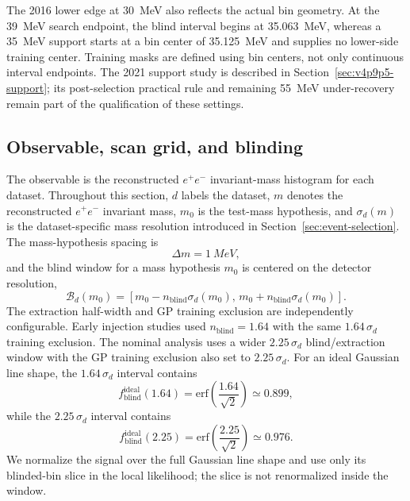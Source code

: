 The 2016 lower edge at 30~MeV also reflects the actual bin geometry. At the
39~MeV search endpoint, the blind interval begins at 35.063~MeV, whereas a
35~MeV support starts at a bin center of 35.125~MeV and supplies no lower-side
training center. Training masks are defined using bin centers, not only
continuous interval endpoints. The 2021 support study is described in
Section~\ref{sec:v4p9p5-support}; its post-selection practical rule and remaining
55~MeV under-recovery remain part of the qualification of these settings.

\subsection{Observable, scan grid, and blinding}

The observable is the reconstructed $e^+e^-$ invariant-mass histogram for each
dataset. Throughout this section, $d$ labels the dataset, $m$ denotes the reconstructed
$e^+e^-$ invariant mass, $m_0$ is the test-mass hypothesis, and $\sigma_d(m)$ is the
dataset-specific mass resolution introduced in
Section~\ref{sec:event-selection}. The mass-hypothesis spacing is
\begin{equation}
\Delta m = \SI{1}{MeV},
\end{equation}
and the blind window for a mass hypothesis $m_0$ is centered on the detector
resolution,
\begin{equation}
\mathcal{B}_d(m_0) =
\left[m_0 - n_{\mathrm{blind}}\sigma_d(m_0),\,
      m_0 + n_{\mathrm{blind}}\sigma_d(m_0)\right].
\end{equation}
The extraction half-width and GP training exclusion are independently configurable.
Early injection studies used
$n_{\mathrm{blind}}=1.64$ with the same $1.64\,\sigma_d$ training exclusion. The nominal
analysis uses a
wider $2.25\,\sigma_d$ blind/extraction window with the GP training exclusion also set
to $2.25\,\sigma_d$. For an ideal Gaussian line shape, the $1.64\,\sigma_d$ interval
contains
\begin{equation}
f_{\mathrm{blind}}^{\mathrm{ideal}}(1.64)
= \mathrm{erf}\!\left(\frac{1.64}{\sqrt{2}}\right)
\simeq 0.899,
\end{equation}
while the $2.25\,\sigma_d$ interval contains
\begin{equation}
f_{\mathrm{blind}}^{\mathrm{ideal}}(2.25)
= \mathrm{erf}\!\left(\frac{2.25}{\sqrt{2}}\right)
\simeq 0.976.
\end{equation}
We normalize the signal over the full Gaussian line shape and use only its blinded-bin
slice in the local likelihood; the slice is not renormalized inside the window.


